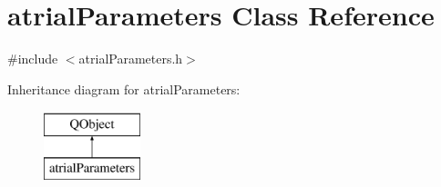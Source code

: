 \hypertarget{classatrial_parameters}{\section{atrial\+Parameters Class Reference}
\label{classatrial_parameters}
}


{\ttfamily \#include $<$atrial\+Parameters.\+h$>$}

Inheritance diagram for atrial\+Parameters\+:\begin{figure}[H]
\begin{center}
\leavevmode
\includegraphics[height=2.000000cm]{classatrial_parameters}
\end{center}
\end{figure}
